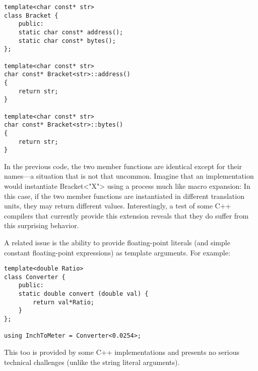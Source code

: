 \begin{lstlisting}[style=styleCXX]
template<char const* str>
class Bracket {
	public:
	static char const* address();
	static char const* bytes();
};

template<char const* str>
char const* Bracket<str>::address()
{
	return str;
}

template<char const* str>
char const* Bracket<str>::bytes()
{
	return str;
}
\end{lstlisting}

In the previous code, the two member functions are identical except for their names—a situation that is not that uncommon. Imagine that an implementation would instantiate Bracket<"X"> using a process much like macro expansion: In this case, if the two member functions are instantiated in different translation units, they may return different values. Interestingly, a test of some C++ compilers that currently provide this extension reveals that they do suffer from this surprising behavior.

A related issue is the ability to provide floating-point literals (and simple constant floating-point expressions) as template arguments. For example:


\begin{lstlisting}[style=styleCXX]
template<double Ratio>
class Converter {
	public:
	static double convert (double val) {
		return val*Ratio;
	}
};

using InchToMeter = Converter<0.0254>;
\end{lstlisting}

This too is provided by some C++ implementations and presents no serious technical challenges (unlike the string literal arguments).

